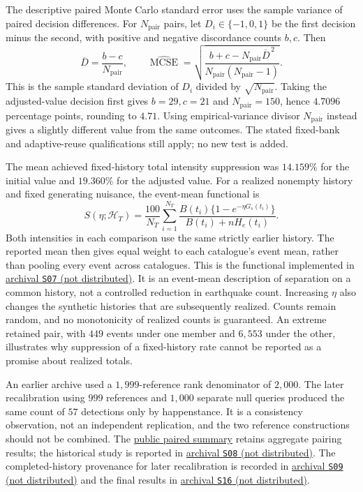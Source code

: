 The descriptive paired Monte Carlo standard error uses the sample variance of paired decision differences. For \(N_{\mathrm{pair}}\) pairs, let \(D_i\in\{-1,0,1\}\) be the first decision minus the second, with positive and negative discordance counts \(b,c\). Then
\[
 \overline D=\frac{b-c}{N_{\mathrm{pair}}},\qquad
 \widehat{\operatorname{MCSE}}
 =\sqrt{\frac{b+c-N_{\mathrm{pair}}\overline D^{\,2}}
 {N_{\mathrm{pair}}(N_{\mathrm{pair}}-1)}}.
\]
This is the sample standard deviation of \(D_i\) divided by \(\sqrt{N_{\mathrm{pair}}}\). Taking the adjusted-value decision first gives \(b=29,c=21\) and \(N_{\mathrm{pair}}=150\), hence \(4.7096\) percentage points, rounding to \(4.71\). Using empirical-variance divisor \(N_{\mathrm{pair}}\) instead gives a slightly different value from the same outcomes. The stated fixed-bank and adaptive-reuse qualifications still apply; no new test is added.

The mean achieved fixed-history total intensity suppression was \(14.159\%\) for the initial value and \(19.360\%\) for the adjusted value. For a realized nonempty history and fixed generating nuisance, the event-mean functional is
\begin{equation}
 S(\eta;\mathcal H_T)=\frac{100}{N_T}\sum_{i=1}^{N_T}
 \frac{B(t_i)\{1-e^{-\eta G_s(t_i)}\}}
      {B(t_i)+nH_e(t_i)}.
 \label{eq:achieved-suppression}
\end{equation}
Both intensities in each comparison use the same strictly earlier history. The reported mean then gives equal weight to each catalogue's event mean, rather than pooling every event across catalogues. This is the functional implemented in \hyperlink{S07}{archival \texttt{S07} (not distributed)}.
It is an event-mean description of separation on a common history, not a controlled reduction in earthquake count. Increasing \(\eta\) also changes the synthetic histories that are subsequently realized. Counts remain random, and no monotonicity of realized counts is guaranteed. An extreme retained pair, with \(449\) events under one member and \(6{,}553\) under the other, illustrates why suppression of a fixed-history rate cannot be reported as a promise about realized totals.

An earlier archive used a \(1{,}999\)-reference rank denominator of \(2{,}000\). The later recalibration using \(999\) references and \(1{,}000\) separate null queries produced the same count of \(57\) detections only by happenstance. It is a consistency observation, not an independent replication, and the two reference constructions should not be combined. The \href{https://github.com/Drefetr/InhibitoryEarthquakeModels/blob/3e76a174cf4f58ce601c6c9640c4d0c11168813f/paper/data/paired.json}{public paired summary} retains aggregate pairing results; the historical study is reported in \hyperlink{S08}{archival \texttt{S08} (not distributed)}. The completed-history provenance for later recalibration is recorded in \hyperlink{S09}{archival \texttt{S09} (not distributed)} and the final results in \hyperlink{S16}{archival \texttt{S16} (not distributed)}.

